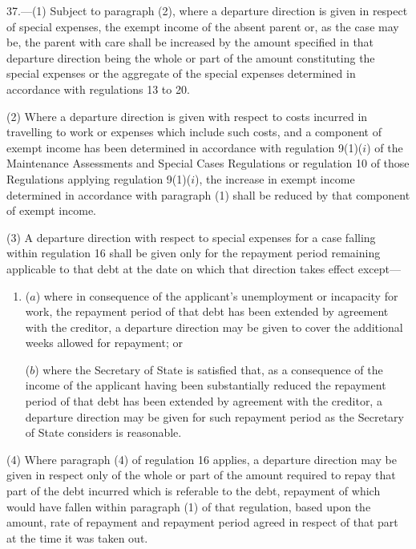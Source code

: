 \documentclass[12pt,a4paper]{article}
\begin{document}
37.—(1) Subject to paragraph (2), where a departure direction is given in respect of special expenses, the exempt income of the absent parent or, as the case may be, the parent with care shall be increased by 
the amount specified in that departure direction being the whole or part of  %
the amount constituting the special expenses or the aggregate of the special expenses determined in accordance with regulations 13 to 20.

(2) Where a departure direction is given with respect to costs incurred in
travelling to work or expenses which include such costs, and a component of
exempt income has been determined in accordance with regulation 9(1)($i$) of the
Maintenance Assessments and Special Cases Regulations or regulation 10 of those
Regulations applying regulation 9(1)($i$), the increase in exempt income
determined in accordance with paragraph (1) shall be reduced by that component
of exempt income.

(3) A departure direction with respect to special expenses for a case falling
within regulation 16 shall be given only for the repayment period remaining
applicable to that debt at the date on which that direction takes effect except—
\begin{enumerate}\item[]
($a$) where in consequence of the applicant’s unemployment or incapacity for work,
the repayment period of that debt has been extended by agreement with the
creditor, a departure direction may be given to cover the additional weeks
allowed for repayment; or

($b$) where the Secretary of State is satisfied that, as a consequence of the
income of the applicant having been substantially reduced the repayment period
of that debt has been extended by agreement with the creditor, a departure
direction may be given for such repayment period as the Secretary of State
considers is reasonable.
\end{enumerate}

(4) Where paragraph (4) of regulation 16 applies, a departure direction may be given in respect only of 
the whole or part of the amount required to repay  %
that part of the debt incurred which is referable to the debt, repayment of which would have fallen within paragraph (1) of that regulation, based upon the amount, rate of repayment and repayment period agreed in respect of that part at the time it was taken out.
\end{document}
